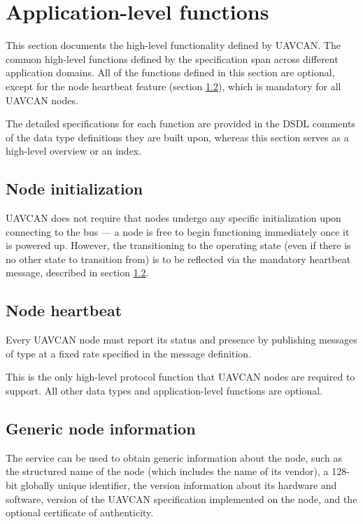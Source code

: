 \section{Application-level functions}\label{sec:application_level_functions}

This section documents the high-level functionality defined by UAVCAN.
The common high-level functions defined by the specification span across different application domains.
All of the functions defined in this section are optional,
except for the node heartbeat feature (section \ref{sec:application_node_heartbeat}),
which is mandatory for all UAVCAN nodes.

The detailed specifications for each function are provided in the DSDL comments of the data type definitions
they are built upon, whereas this section serves as a high-level overview or an index.

\subsection{Node initialization}

UAVCAN does not require that nodes undergo any specific initialization upon connecting to the bus ---
a node is free to begin functioning immediately once it is powered up.
However, the transitioning to the operating state (even if there is no other state to transition from)
is to be reflected via the mandatory heartbeat message, described in section \ref{sec:application_node_heartbeat}.

\subsection{Node heartbeat}\label{sec:application_node_heartbeat}

Every UAVCAN node must report its status and presence by publishing messages of type
 at a fixed rate specified in the message definition.

This is the only high-level protocol function that UAVCAN nodes are required to support.
All other data types and application-level functions are optional.


\subsection{Generic node information}

The service  can be used to obtain generic information about the node,
such as the structured name of the node (which includes the name of its vendor),
a 128-bit globally unique identifier, the version information about its hardware and software,
version of the UAVCAN specification implemented on the node, and the optional certificate of authenticity.

